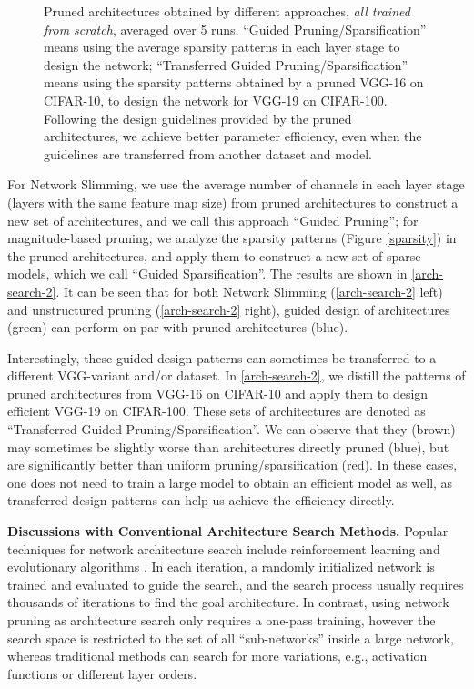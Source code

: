 \begin{figure}[!ht]
\begin{minipage}{.47\textwidth}
\begin{subfigure}{\textwidth}
 \end{subfigure}
\end{minipage}
    \vspace{-1ex}
    \caption{
      Pruned architectures obtained by different approaches, \emph{all trained from scratch}, averaged over 5 runs.
      ``Guided Pruning/Sparsification'' means using the average sparsity patterns in each layer stage  to design the network; ``Transferred Guided Pruning/Sparsification'' means using the sparsity patterns obtained by a pruned VGG-16 on CIFAR-10, to design the network for VGG-19 on CIFAR-100. 
    Following the design guidelines provided by the pruned architectures, we achieve better parameter efficiency, even when the guidelines are transferred from another dataset and model.}
    \label{arch-search-2}
\end{figure}


For Network Slimming, we use the average number of channels in each layer stage (layers with the same feature map size) from pruned architectures to construct a new set of architectures, and we call this approach ``Guided Pruning'';
for magnitude-based pruning, we analyze the sparsity patterns (Figure \ref{sparsity}) in the pruned architectures,
and apply them to construct a new set of sparse models, which we call ``Guided Sparsification''. The results are shown in \autoref{arch-search-2}. It can be seen that for both Network Slimming (\autoref{arch-search-2} left) and unstructured pruning (\autoref{arch-search-2} right), guided design of architectures (green) can perform on par with pruned architectures (blue).

Interestingly, these guided design patterns can sometimes be transferred to a different VGG-variant and/or dataset. In \autoref{arch-search-2}, we distill the patterns of pruned architectures from VGG-16 on CIFAR-10 and apply them to design efficient VGG-19 on CIFAR-100. These sets of architectures are denoted as ``Transferred Guided Pruning/Sparsification''. We can observe that they (brown) may sometimes be slightly worse than architectures directly pruned (blue), but are significantly better than uniform pruning/sparsification (red). In these cases, one does not need to train a large model  to obtain an efficient model as well, as transferred design patterns can help us achieve the efficiency directly. 

\vspace{1.5ex}
\textbf{Discussions with Conventional Architecture Search Methods.}  Popular techniques for network architecture search include reinforcement learning \citep{rl1, rl2} and evolutionary algorithms \citep{genetic,liu2017hierarchical}. In each iteration, a randomly initialized network is trained and evaluated to guide the search, and the search process usually requires thousands of iterations to find the goal architecture. In contrast, using network pruning as architecture search  only requires a one-pass training, however the search space is restricted to the set of all ``sub-networks'' inside a large network, whereas traditional methods can search for more variations, e.g., activation functions or different layer orders.

